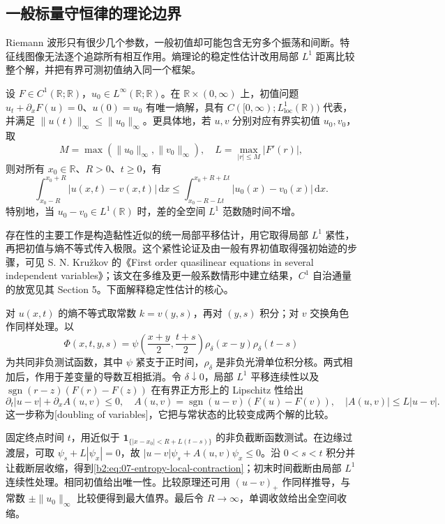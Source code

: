 \subsection{一般标量守恒律的理论边界}
\label{b2:subsec:070504}

Riemann 波形只有很少几个参数，一般初值却可能包含无穷多个振荡和间断。特征线图像无法逐个追踪所有相互作用。熵理论的稳定性估计改用局部 \(L^1\) 距离比较整个解，并把有界可测初值纳入同一个框架。

\begin{theorem}\label{b2:thm:07-kruzkov}
设 \(F\in C^1(\mathbb R;\mathbb R)\)，\(u_0\in L^\infty(\mathbb R;\mathbb R)\)。在 \(\mathbb R\times(0,\infty)\) 上，初值问题
\(u_t+\partial_xF(u)=0\)、\(u(0)=u_0\) 有唯一熵解，具有
\(C([0,\infty);L^1_{\mathrm{loc}}(\mathbb R))\) 代表，并满足
\(\|u(t)\|_\infty\leq\|u_0\|_\infty\)。更具体地，若 \(u,v\) 分别对应有界实初值 \(u_0,v_0\)，取
\[
 M=\max(\|u_0\|_\infty,\|v_0\|_\infty),
 \quad L=\max_{|r|\leq M}|F'(r)|,
\]
则对所有 \(x_0\in\mathbb R\)、\(R>0\)、\(t\geq0\)，有
\begin{equation}\label{b2:eq:07-entropy-local-contraction}
 \int_{x_0-R}^{x_0+R}|u(x,t)-v(x,t)|\,\mathrm dx
 \leq\int_{x_0-R-Lt}^{x_0+R+Lt}|u_0(x)-v_0(x)|\,\mathrm dx.
\end{equation}
特别地，当 \(u_0-v_0\in L^1(\mathbb R)\) 时，差的全空间 \(L^1\) 范数随时间不增。
\end{theorem}
\begin{proofsketch}
存在性的主要工作是构造黏性近似的统一局部平移估计，用它取得局部 \(L^1\) 紧性，再把初值与熵不等式传入极限。这个紧性论证及由一般有界初值取得强初始迹的步骤，可见 S. N. Kružkov 的《First order quasilinear equations in several independent variables》\cite[Sections 3--5]{Kruzkov1970FirstOrder}；该文在多维及更一般系数情形中建立结果，\(C^1\) 自治通量的放宽见其 Section 5。下面解释稳定性估计的核心。

对 \(u(x,t)\) 的熵不等式取常数 \(k=v(y,s)\)，再对 \((y,s)\) 积分；对 \(v\) 交换角色作同样处理。以
\[
 \Phi(x,t,y,s)=
 \psi\left(\frac{x+y}{2},\frac{t+s}{2}\right)
 \rho_\delta(x-y)\rho_\delta(t-s)
\]
为共同非负测试函数，其中 \(\psi\) 紧支于正时间，\(\rho_\delta\) 是非负光滑单位积分核。两式相加后，作用于差变量的导数互相抵消。令 \(\delta\downarrow0\)，局部 \(L^1\) 平移连续性以及
\(\operatorname{sgn}(r-z)(F(r)-F(z))\) 在有界正方形上的 Lipschitz 性给出
\[
 \partial_t|u-v|+\partial_x A(u,v)\leq0,
 \quad A(u,v)=\operatorname{sgn}(u-v)(F(u)-F(v)),
 \quad |A(u,v)|\leq L|u-v|.
\]
这一步称为[doubling of variables]，它把与常状态的比较变成两个解的比较。

固定终点时间 \(t\)，用近似于
\(\mathbf1_{\{|x-x_0|<R+L(t-s)\}}\) 的非负截断函数测试。在边缘过渡层，可取
\(\psi_s+L|\psi_x|=0\)，故
\(|u-v|\psi_s+A(u,v)\psi_x\leq0\)。沿 \(0<s<t\) 积分并让截断层收缩，得到\eqref{b2:eq:07-entropy-local-contraction}；初末时间截断由局部 \(L^1\) 连续性处理。相同初值给出唯一性。比较原理还可用 \((u-v)_+\) 作同样推导，与常数 \(\pm\|u_0\|_\infty\) 比较便得到最大值界。最后令 \(R\to\infty\)，单调收敛给出全空间收缩。
\end{proofsketch}

